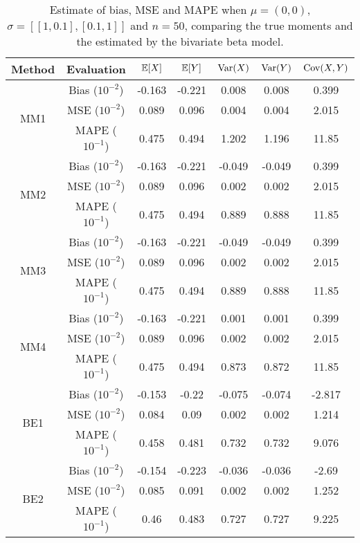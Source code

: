 \begin{table}[htbp]
\centering
\begin{tabular}{c|c|ccccc}
Method & Evaluation & $\mathbb{E}[X]$ & $\mathbb{E}[Y]$ & $\operatorname{Var}(X)$ & $\operatorname{Var}(Y)$ & $\operatorname{Cov}(X,Y)$ \\ 
\hline \multirow{3}{*}{MM1}& Bias ($10^{-2}$)  & -0.163 & -0.221 & 0.008 & 0.008 & 0.399 \\ 
& MSE ($10^{-2}$)  & 0.089 & 0.096 & 0.004 & 0.004 & 2.015 \\ 
& MAPE ($10^{-1}$)  & 0.475 & 0.494 & 1.202 & 1.196 & 11.85 \\ 
\hline \multirow{3}{*}{MM2}& Bias ($10^{-2}$)  & -0.163 & -0.221 & -0.049 & -0.049 & 0.399 \\ 
& MSE ($10^{-2}$)  & 0.089 & 0.096 & 0.002 & 0.002 & 2.015 \\ 
& MAPE ($10^{-1}$)  & 0.475 & 0.494 & 0.889 & 0.888 & 11.85 \\ 
\hline \multirow{3}{*}{MM3}& Bias ($10^{-2}$)  & -0.163 & -0.221 & -0.049 & -0.049 & 0.399 \\ 
& MSE ($10^{-2}$)  & 0.089 & 0.096 & 0.002 & 0.002 & 2.015 \\ 
& MAPE ($10^{-1}$)  & 0.475 & 0.494 & 0.889 & 0.888 & 11.85 \\ 
\hline \multirow{3}{*}{MM4}& Bias ($10^{-2}$)  & -0.163 & -0.221 & 0.001 & 0.001 & 0.399 \\ 
& MSE ($10^{-2}$)  & 0.089 & 0.096 & 0.002 & 0.002 & 2.015 \\ 
& MAPE ($10^{-1}$)  & 0.475 & 0.494 & 0.873 & 0.872 & 11.85 \\ 
\hline \multirow{3}{*}{BE1}& Bias ($10^{-2}$)  & -0.153 & -0.22 & -0.075 & -0.074 & -2.817 \\ 
& MSE ($10^{-2}$)  & 0.084 & 0.09 & 0.002 & 0.002 & 1.214 \\ 
& MAPE ($10^{-1}$)  & 0.458 & 0.481 & 0.732 & 0.732 & 9.076 \\ 
\hline \multirow{3}{*}{BE2}& Bias ($10^{-2}$)  & -0.154 & -0.223 & -0.036 & -0.036 & -2.69 \\ 
& MSE ($10^{-2}$)  & 0.085 & 0.091 & 0.002 & 0.002 & 1.252 \\ 
& MAPE ($10^{-1}$)  & 0.46 & 0.483 & 0.727 & 0.727 & 9.225 \\
\end{tabular}
\caption{\label{tab:alpha-experiment4}Estimate of bias, MSE and MAPE when $\mu = (0,0)$, $\sigma = [[1,0.1], [0.1,1]]$ and $n=50$, comparing the true moments and the estimated by the bivariate beta model.}
\end{table}